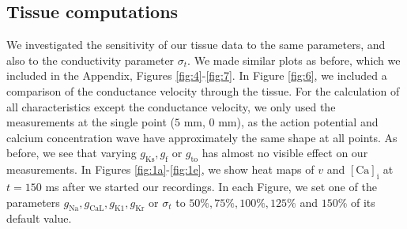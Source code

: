\documentclass{article}
\begin{document}
\subsection{Tissue computations} \label{Tissue computations}
We investigated the sensitivity of our tissue data to the same parameters, and also to the conductivity parameter $\sigma_t$. We made similar plots as before, which we included in the Appendix, Figures \ref{fig:4}-\ref{fig:7}. In Figure \ref{fig:6}, we included a comparison of the conductance velocity through the tissue. For the calculation of all characteristics except the conductance velocity, we only used the measurements at the single point ($5$ mm, $0$ mm), as the action potential and calcium concentration wave have approximately the same shape at all points. As before, we see that varying $g_{\mathrm{Ks}}, g_{\mathrm{f}}$ or $g_{\mathrm{to}}$ has almost no visible effect on our measurements.  In Figures  \ref{fig:1a}-\ref{fig:1e}, we show heat maps of $v$ and $[\mathrm{Ca}]_{\mathrm{i}}$ at $t=150$ ms after we started our recordings. In each Figure, we set one of the parameters $g_{\mathrm{Na}}, g_{\mathrm{CaL}}, g_{\mathrm{K1}}, g_{\mathrm{Kr}}$ or $\sigma_t$ to $50\%, 75\%, 100\%, 125\%$ and $150\%$ of its default value.
%
\end{document}
